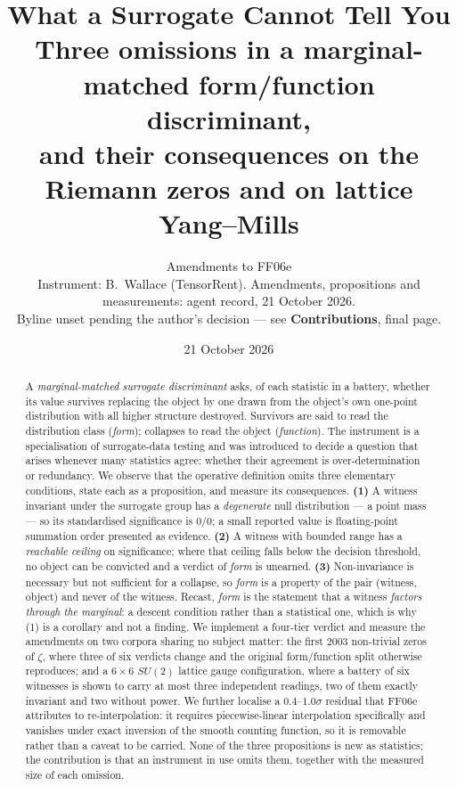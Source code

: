 \documentclass[11pt]{article}
\title{\textbf{What a Surrogate Cannot Tell You}\\[2pt]
\large Three omissions in a marginal-matched form/function discriminant,\\
and their consequences on the Riemann zeros and on lattice Yang--Mills}
\author{Amendments to FF06e\\
\small Instrument: B.\ Wallace (TensorRent).
Amendments, propositions and measurements: agent record, 21 October 2026.\\
\small Byline unset pending the author's decision --- see \textbf{Contributions}, final page.}
\date{21 October 2026}
\theoremstyle{remark}
\begin{document}
\maketitle

\begin{abstract}
A \emph{marginal-matched surrogate discriminant} asks, of each statistic in a battery,
whether its value survives replacing the object by one drawn from the object's own
one-point distribution with all higher structure destroyed. Survivors are said to read
the distribution class (\emph{form}); collapses to read the object (\emph{function}).
The instrument is a specialisation of surrogate-data testing \cite{theiler} and was
introduced to decide a question that arises whenever many statistics agree: whether
their agreement is over-determination or redundancy. We observe that the operative
definition omits three elementary conditions, state each as a proposition, and measure
its consequences. \textbf{(1)} A witness invariant under the surrogate group has a
\emph{degenerate} null distribution --- a point mass --- so its standardised
significance is $0/0$; a small reported value is floating-point summation order
presented as evidence. \textbf{(2)} A witness with bounded range has a \emph{reachable
ceiling} on significance; where that ceiling falls below the decision threshold, no
object can be convicted and a verdict of \emph{form} is unearned. \textbf{(3)}
Non-invariance is necessary but not sufficient for a collapse, so \emph{form} is a
property of the pair (witness, object) and never of the witness. Recast, \emph{form}
is the statement that a witness \emph{factors through the marginal}: a descent
condition rather than a statistical one, which is why (1) is a corollary and not a
finding. We implement a four-tier verdict and measure the amendments on two corpora
sharing no subject matter: the first $2003$ non-trivial zeros of $\zeta$, where three
of six verdicts change and the original form/function split otherwise reproduces; and
a $6\times6$ $SU(2)$ lattice gauge configuration, where a battery of six witnesses is
shown to carry at most three independent readings, two of them exactly invariant and
two without power. We further localise a $0.4$--$1.0\sigma$ residual that FF06e
attributes to re-interpolation: it requires piecewise-linear interpolation
specifically and vanishes under exact inversion of the smooth counting function, so it
is removable rather than a caveat to be carried. None of the three propositions is new
as statistics; the contribution is that an instrument in use omits them, together with
the measured size of each omission.
\end{abstract}
\end{document}
